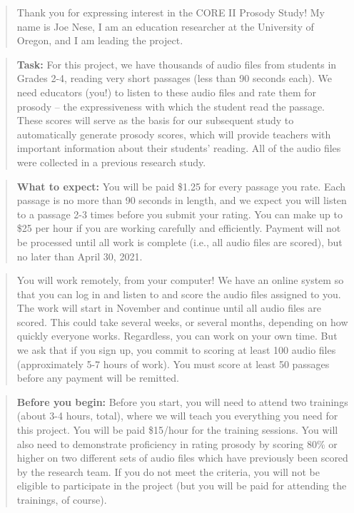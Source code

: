 \documentclass[
]{article}
\begin{document}
\begin{quote}
Thank you for expressing interest in the CORE II Prosody Study! My name
is Joe Nese, I am an education researcher at the University of Oregon,
and I am leading the project.
\end{quote}

\begin{quote}
\textbf{Task:} For this project, we have thousands of audio files from
students in Grades 2-4, reading very short passages (less than 90
seconds each). We need educators (you!) to listen to these audio files
and rate them for prosody -- the expressiveness with which the student
read the passage. These scores will serve as the basis for our
subsequent study to automatically generate prosody scores, which will
provide teachers with important information about their students'
reading. All of the audio files were collected in a previous research
study.
\end{quote}

\begin{quote}
\textbf{What to expect:} You will be paid \$1.25 for every passage you
rate. Each passage is no more than 90 seconds in length, and we expect
you will listen to a passage 2-3 times before you submit your rating.
You can make up to \$25 per hour if you are working carefully and
efficiently. Payment will not be processed until all work is complete
(i.e., all audio files are scored), but no later than April 30, 2021.
\end{quote}

\begin{quote}
You will work remotely, from your computer! We have an online system so
that you can log in and listen to and score the audio files assigned to
you. The work will start in November and continue until all audio files
are scored. This could take several weeks, or several months, depending
on how quickly everyone works. Regardless, you can work on your own
time. But we ask that if you sign up, you commit to scoring at least 100
audio files (approximately 5-7 hours of work). You must score at least
50 passages before any payment will be remitted.
\end{quote}

\begin{quote}
\textbf{Before you begin:} Before you start, you will need to attend two
trainings (about 3-4 hours, total), where we will teach you everything
you need for this project. You will be paid \$15/hour for the training
sessions. You will also need to demonstrate proficiency in rating
prosody by scoring 80\% or higher on two different sets of audio files
which have previously been scored by the research team. If you do not
meet the criteria, you will not be eligible to participate in the
project (but you will be paid for attending the trainings, of course).
\end{quote}
\end{document}
